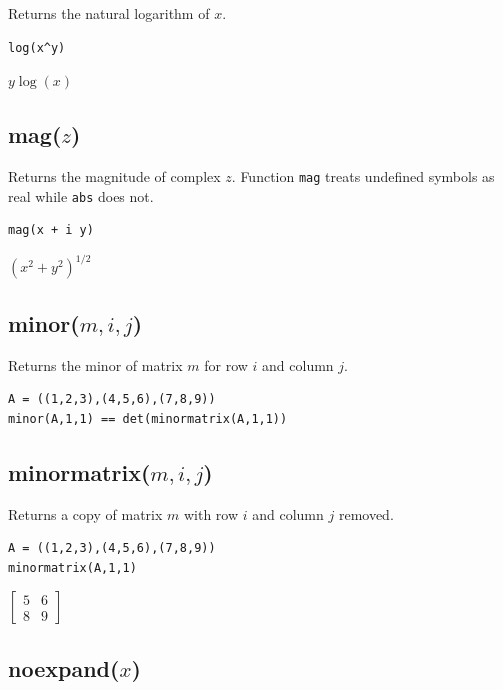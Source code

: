 \documentclass[12pt]{article}
\begin{document}
Returns the natural logarithm of $x$.

{\color{blue}
\begin{verbatim}
log(x^y)
\end{verbatim}
}

\noindent
$y\log(x)$

\subsection*{mag($z$)}

Returns the magnitude of complex $z$.
Function {\tt mag} treats undefined symbols as real while {\tt abs} does not.

{\color{blue}
\begin{verbatim}
mag(x + i y)
\end{verbatim}
}

\noindent
$\displaystyle (x^2+y^2)^{1/2}$

\subsection*{minor($m,i,j$)}

Returns the minor of matrix $m$ for row $i$ and column $j$.

{\color{blue}
\begin{verbatim}
A = ((1,2,3),(4,5,6),(7,8,9))
minor(A,1,1) == det(minormatrix(A,1,1))
\end{verbatim}
}


\subsection*{minormatrix($m,i,j$)}

Returns a copy of matrix $m$ with row $i$ and column $j$ removed.

{\color{blue}
\begin{verbatim}
A = ((1,2,3),(4,5,6),(7,8,9))
minormatrix(A,1,1)
\end{verbatim}
}

\noindent
$\displaystyle
\begin{bmatrix}
5 & 6
\\[1ex]
8 & 9
\end{bmatrix}
$

\subsection*{noexpand($x$)}
\end{document}
